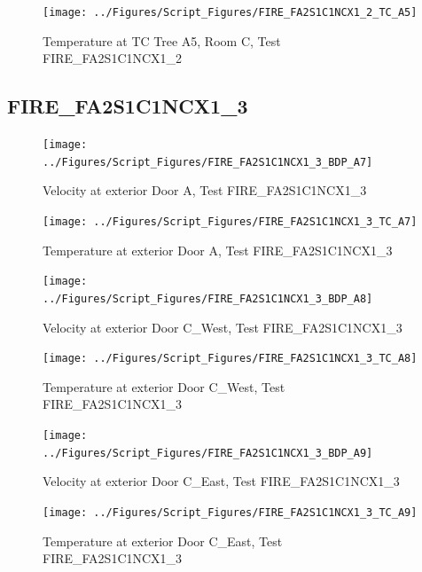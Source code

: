 \documentclass[12pt,oneside]{book}
\begin{document}
\begin{figure}[!ht]
\texttt{[image: ../Figures/Script\_Figures/FIRE\_FA2S1C1NCX1\_2\_TC\_A5]}
\caption{Temperature at TC Tree A5, Room C, Test FIRE\_FA2S1C1NCX1\_2}
\label{fig:FIRE_FA2S1C1NCX1_2_TC_A5}
\end{figure}


\clearpage


\subsection{FIRE\_FA2S1C1NCX1\_3}

\begin{figure}[!ht]
\texttt{[image: ../Figures/Script\_Figures/FIRE\_FA2S1C1NCX1\_3\_BDP\_A7]}
\caption{Velocity at exterior Door A, Test FIRE\_FA2S1C1NCX1\_3}
\label{fig:FIRE_FA2S1C1NCX1_3_BDP_A7}
\end{figure}

\begin{figure}[!ht]
\texttt{[image: ../Figures/Script\_Figures/FIRE\_FA2S1C1NCX1\_3\_TC\_A7]}
\caption{Temperature at exterior Door A, Test FIRE\_FA2S1C1NCX1\_3}
\label{fig:FIRE_FA2S1C1NCX1_3_TC_A7}
\end{figure}

\begin{figure}[!ht]
\texttt{[image: ../Figures/Script\_Figures/FIRE\_FA2S1C1NCX1\_3\_BDP\_A8]}
\caption{Velocity at exterior Door C\_West, Test FIRE\_FA2S1C1NCX1\_3}
\label{fig:FIRE_FA2S1C1NCX1_3_BDP_A8}
\end{figure}

\begin{figure}[!ht]
\texttt{[image: ../Figures/Script\_Figures/FIRE\_FA2S1C1NCX1\_3\_TC\_A8]}
\caption{Temperature at exterior Door C\_West, Test FIRE\_FA2S1C1NCX1\_3}
\label{fig:FIRE_FA2S1C1NCX1_3_TC_A8}
\end{figure}

\begin{figure}[!ht]
\texttt{[image: ../Figures/Script\_Figures/FIRE\_FA2S1C1NCX1\_3\_BDP\_A9]}
\caption{Velocity at exterior Door C\_East, Test FIRE\_FA2S1C1NCX1\_3}
\label{fig:FIRE_FA2S1C1NCX1_3_BDP_A9}
\end{figure}

\begin{figure}[!ht]
\texttt{[image: ../Figures/Script\_Figures/FIRE\_FA2S1C1NCX1\_3\_TC\_A9]}
\caption{Temperature at exterior Door C\_East, Test FIRE\_FA2S1C1NCX1\_3}
\label{fig:FIRE_FA2S1C1NCX1_3_TC_A9}
\end{figure}
\end{document}
